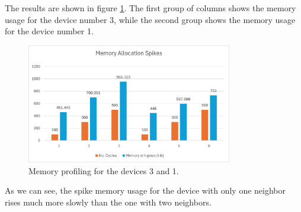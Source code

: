 The results are shown in figure \ref{fig:memory_profiling}. The first group of columns shows the memory usage for the device number 3, while the second group shows the memory usage for the device number 1.

\begin{figure}[ht!]
    \centering
    \includegraphics[width=0.8\textwidth]{figures/mem-spikes.png}
    \caption{Memory profiling for the devices 3 and 1.}
    \label{fig:memory_profiling}
\end{figure}

As we can see, the spike memory usage for the device with only one neighbor rises much more slowly than the one with two neighbors.